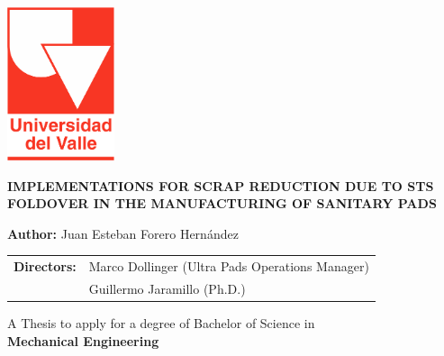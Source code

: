 
\begin{titlepage}
    \begin{center}
        \vspace{-2cm}
        \includegraphics[height=45mm]{LOGOS/LogoUnivalle (1).png}\\
        
        \vspace{2 cm}
        
        {\large \textbf{IMPLEMENTATIONS FOR SCRAP REDUCTION DUE TO STS FOLDOVER IN THE MANUFACTURING OF SANITARY PADS}}
        
        \vspace{1 cm}
    
        
        
        \textbf{Author:} Juan Esteban Forero Hernández\\
        
        \vspace{0.2cm}
        
        \begin{tabular}{ll} 
            \textbf{Directors:} & Marco Dollinger (Ultra Pads Operations Manager) \\ & Guillermo Jaramillo (Ph.D.) \\
        \end{tabular}
                
        \vspace{0.5 cm}
             A Thesis to apply for a degree of Bachelor of Science in\\ \textbf{Mechanical Engineering}
        

\end{center}
\end{titlepage}
